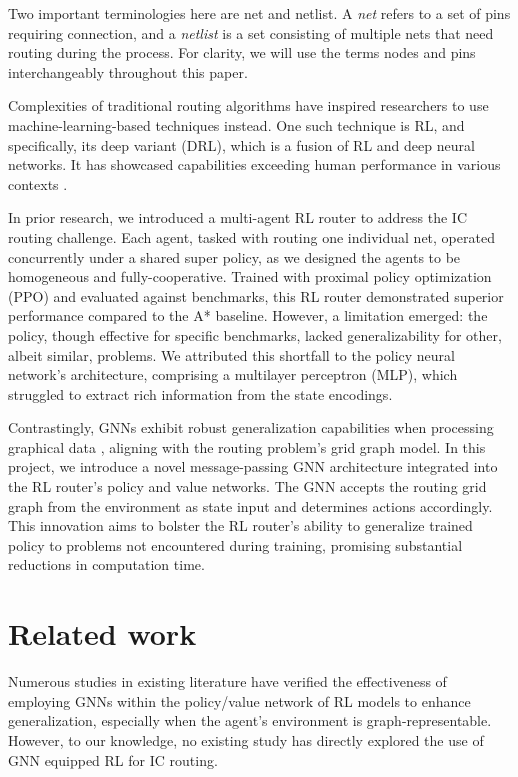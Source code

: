 \documentclass[letterpaper]{article}
\begin{document}
Two important terminologies here are net and netlist. A {\it net} refers to a
set of pins requiring connection, and a {\it netlist} is a set consisting of
multiple nets that need routing during the process. For clarity, we will use the
terms {nodes} and {pins} interchangeably throughout this paper.

Complexities of traditional routing algorithms have inspired researchers to
use machine-learning-based techniques instead. One such technique is
RL, and specifically, its deep variant (DRL), which is
a fusion of RL and deep neural networks. It has showcased capabilities exceeding
human performance in various contexts \cite{mnih2013playing}.

In prior research, we introduced a multi-agent RL router to address the IC
routing challenge. Each agent, tasked with routing one individual net, operated
concurrently under a shared super policy, as we designed the agents to be
homogeneous and fully-cooperative. Trained with proximal policy optimization
(PPO) \cite{Schulman2017} and evaluated against benchmarks, this RL router
demonstrated superior performance compared to the A* baseline. However, a
limitation emerged: the policy, though effective for specific benchmarks, lacked
generalizability for other, albeit similar, problems. We attributed this
shortfall to the policy neural network's architecture, comprising a multilayer perceptron (MLP), which struggled to extract rich information from the
state encodings.

Contrastingly, GNNs exhibit robust generalization
capabilities when processing graphical data \cite{Almasan2022,Wang2018},
aligning with the routing problem’s grid graph model. In this project, we
introduce a novel message-passing GNN architecture integrated into the RL
router’s policy and value networks. The GNN accepts the routing grid graph from the
environment as state input and determines actions accordingly. This innovation
aims to bolster the RL router’s ability to generalize trained policy to problems
not encountered during training, promising substantial reductions in computation
time.


\section{Related work}
Numerous studies in existing literature have verified the effectiveness of
employing GNNs within the policy/value network of
RL models to enhance generalization, especially when
the agent’s environment is graph-representable. However, to our knowledge, no
existing study has directly explored the use of GNN equipped RL for IC routing.
\end{document}
